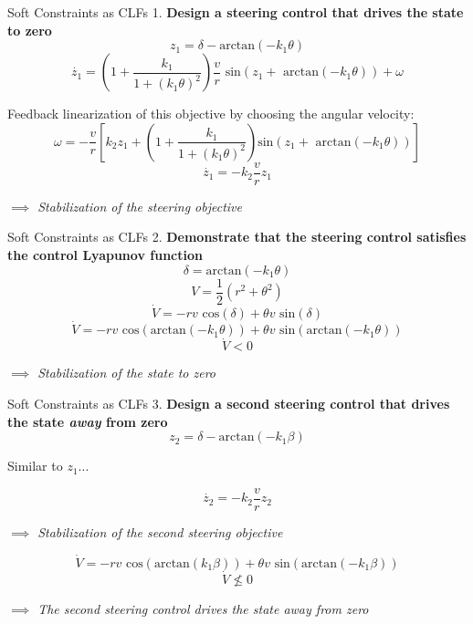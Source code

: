 \documentclass[10pt]{beamer}
\begin{document}
\begin{frame}{Soft Constraints as CLFs}
1. \textbf{Design a steering control that drives the state to zero}
$$z_1 = \delta - \text{arctan}(-k_1\theta)$$\pause
$$\dot{z_1}=\left( 1+\frac{k_1}{1+(k_1\theta)^2}\right) \frac{v}{r}\text{ sin}(z_1+\text{ arctan}(-k_1\theta))+\omega$$\pause


Feedback linearization of this objective by choosing the angular velocity: $$\omega = -\frac{v}{r}\left[ k_2 z_1+\left( 1 + \frac{k_1}{1+(k_1\theta)^2} \right) \text{sin}(z_1+\text{ arctan}(-k_1\theta))\right]$$\pause
$$ \dot{z_1}=-k_2\frac{v}{r}z_1 $$\begin{center}
\textit{$\implies$ Stabilization of the steering objective}\end{center}
\end{frame}

\begin{frame}{Soft Constraints as CLFs}
2. \textbf{Demonstrate that the steering control satisfies the control Lyapunov function}
$$\delta=\text{arctan}(-k_1\theta)$$\pause
$$V=\frac{1}{2}(r^2+\theta^2)$$\pause
$$\dot{V}=-r v \text{ cos}(\delta) + \theta v \text{ sin}(\delta)$$\pause
$$\dot{V}=-r v \text{ cos}(\text{arctan}(-k_1\theta)) + \theta v \text{ sin}(\text{arctan}(-k_1\theta))$$\pause
$$\dot{V}<0$$\begin{center}
\textit{$\implies$ Stabilization of the state to zero}\end{center}
\end{frame}

\begin{frame}{Soft Constraints as CLFs}
3. \textbf{Design a second steering control that drives the state \textit{away} from zero}
$$z_2 = \delta - \text{arctan}(-k_1\beta)$$\pause

\begin{center}
Similar to $z_1$... \pause
\end{center}

$$ \dot{z_2}=-k_2\frac{v}{r}z_2 $$
\begin{center}\textit{$\implies$ Stabilization of the second steering objective}\end{center}\pause

$$\dot{V}=-r v \text{ cos}(\text{arctan}(k_1\beta)) + \theta v \text{ sin}(\text{arctan}(-k_1\beta))$$\pause
$$\dot{V}\nleq 0$$\begin{center}
\textit{$\implies$ The second steering control drives the state \alert{away} from zero}\end{center}
\end{frame}
\end{document}

